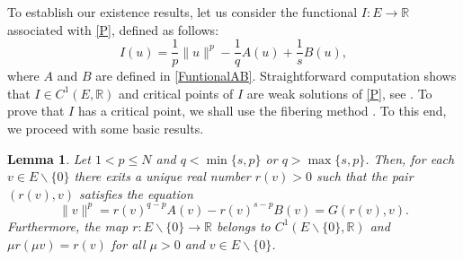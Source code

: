 \documentclass[12pt,reqno]{amsart}
\newtheorem{lemma}[theorem]{Lemma}
\begin{document}
To establish our existence results, let us consider  the functional $I: E\rightarrow \mathds{R}$ associated with  \eqref{P}, defined as follows:
$$
I(u)=\frac{1}{p}\|u\|^p-\frac{1}{q}A(u)+\frac{1}{s}B(u),
$$
where $A$ and $B$ are defined in \eqref{FuntionalAB}. 
Straightforward computation shows that $I\in C^1(E,\mathds{R})$ and critical points of $I$ are weak solutions of \eqref{P}, see \cite{zbMATH05114882}. 
To prove that $I$ has a critical point, we shall use the fibering method \cite{zbMATH01060125,zbMATH05635193}. To this end, we proceed with some basic results.

\begin{lemma}\label{existence of a function r C1}Let $1<p\leq N$ and $q<\min\{s,p\}$ or $q>\max\{s,p\}$. Then, for each $v \in E\backslash\{0\}$ there exits a unique real number $r(v)>0$ such that the pair $(r(v),v)$ satisfies the equation 
  \begin{equation}\label{critical condition}
		\|v\|^p=r(v)^{q-p}A(v)-r(v)^{s-p}B(v)=G(r(v),v).
	\end{equation}
 Furthermore, the map $r:E\backslash\{0\}\rightarrow \mathds{R}$ belongs to $C^1(E\backslash\{0\},\mathds{R})$ and $\mu r(\mu v)=r(v)$ for all $\mu >0$ and $v \in E\backslash\{0\}$.
\end{lemma}
\end{document}
